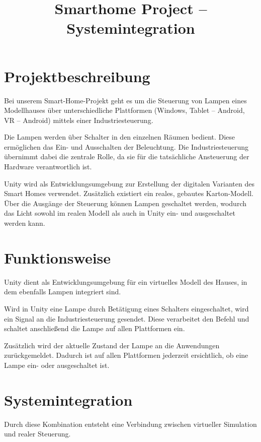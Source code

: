\documentclass[a4paper,12pt]{article}
\title{Smarthome Project – Systemintegration}
\author{}
\date{}
\begin{document}
\maketitle

\tableofcontents
\newpage

\section{Projektbeschreibung}

Bei unserem Smart-Home-Projekt geht es um die Steuerung von Lampen eines Modellhauses über unterschiedliche Plattformen (Windows, Tablet – Android, VR – Android) mittels einer Industriesteuerung.

Die Lampen werden über Schalter in den einzelnen Räumen bedient. Diese ermöglichen das Ein- und Ausschalten der Beleuchtung. Die Industriesteuerung übernimmt dabei die zentrale Rolle, da sie für die tatsächliche Ansteuerung der Hardware verantwortlich ist.

Unity wird als Entwicklungsumgebung zur Erstellung der digitalen Varianten des Smart Homes verwendet. Zusätzlich existiert ein reales, gebautes Karton-Modell. Über die Ausgänge der Steuerung können Lampen geschaltet werden, wodurch das Licht sowohl im realen Modell als auch in Unity ein- und ausgeschaltet werden kann.

\section{Funktionsweise}

Unity dient als Entwicklungsumgebung für ein virtuelles Modell des Hauses, in dem ebenfalls Lampen integriert sind.

Wird in Unity eine Lampe durch Betätigung eines Schalters eingeschaltet, wird ein Signal an die Industriesteuerung gesendet. Diese verarbeitet den Befehl und schaltet anschließend die Lampe auf allen Plattformen ein.

Zusätzlich wird der aktuelle Zustand der Lampe an die Anwendungen zurückgemeldet. Dadurch ist auf allen Plattformen jederzeit ersichtlich, ob eine Lampe ein- oder ausgeschaltet ist.

\section{Systemintegration}

Durch diese Kombination entsteht eine Verbindung zwischen virtueller Simulation und realer Steuerung.
\end{document}
